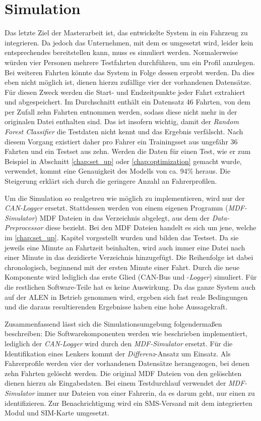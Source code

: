 \section{Simulation}
\label{sec:simulation}

Das letzte Ziel der Masterarbeit ist, das entwickelte System in ein Fahrzeug zu integrieren. Da jedoch das Unternehmen, mit dem es umgesetzt wird, leider kein entsprechendes bereitstellen kann, muss es simuliert werden. Normalerweise würden vier Personen mehrere Testfahrten durchführen, um ein Profil anzulegen. Bei weiteren Fahrten könnte das System in Folge dessen erprobt werden. Da dies eben nicht möglich ist, dienen hierzu zufällige vier der vorhandenen Datensätze. Für diesen Zweck werden die Start- und Endzeitpunkte jeder Fahrt extrahiert und abgespeichert. Im Durchschnitt enthält ein Datensatz 46 Fahrten, von dem per Zufall zehn Fahrten entnommen werden, sodass diese nicht mehr in der originalen Datei enthalten sind. Das ist insofern wichtig, damit der \textit{Random Forest Classifier} die Testdaten nicht kennt und das Ergebnis verfälscht. Nach diesem Vorgang existiert daher pro Fahrer ein Trainingsset aus ungefähr 36 Fahrten und ein Testset aus zehn. Werden die Daten für einen Test, wie er zum Beispiel in Abschnitt \ref{chap:set_up} oder \ref{chap:optimization} gemacht wurde, verwendet, kommt eine Genauigkeit des Modells von ca. 94\% heraus. Die Steigerung erklärt sich durch die geringere Anzahl an Fahrerprofilen.

Um die Simulation so realgetreu wie möglich zu implementieren, wird nur der \textit{CAN-Logger} ersetzt. Stattdessen werden von einem eigenen Programm (\textit{MDF-Simulator}) MDF Dateien in das Verzeichnis abgelegt, aus dem der \textit{Data-Preprocessor} diese bezieht. Bei den MDF Dateien handelt es sich um jene, welche im \ref{chap:set_up}. Kapitel vorgestellt wurden und bilden das Testset. Da sie jeweils eine Minute an Fahrtzeit beinhalten, wird auch immer eine Datei nach einer Minute in das dezidierte Verzeichnis hinzugefügt. Die Reihenfolge ist dabei chronologisch, beginnend mit der ersten Minute einer Fahrt. Durch die neue Komponente wird lediglich das erste Glied (CAN-Bus und -\textit{Logger}) simuliert. Für die restlichen Software-Teile hat es keine Auswirkung. Da das ganze System auch auf der ALEN in Betrieb genommen wird, ergeben sich fast reale Bedingungen und die daraus resultierenden Ergebnisse haben eine hohe Aussagekraft.

Zusammenfassend lässt sich die Simulationsumgebung folgendermaßen beschreiben: Die Softwarekomponenten werden wie beschrieben implementiert, lediglich der \textit{CAN-Logger} wird durch den \textit{MDF-Simulator} ersetzt. Für die Identifikation eines Lenkers kommt der \textit{Differenz}-Ansatz um Einsatz. Als Fahrerprofile werden vier der vorhandenen Datensätze herangezogen, bei denen zehn Fahrten gelöscht werden. Die original MDF Dateien von den gelöschten dienen hierzu als Eingabedaten. Bei einem Testdurchlauf verwendet der \textit{MDF-Simulator} immer nur Dateien von einer Fahrerin, da es darum geht, nur einen zu identifizieren. Zur Benachrichtigung wird ein SMS-Versand mit dem integrierten Modul und SIM-Karte umgesetzt.

